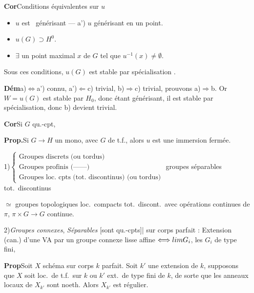 \documentclass[11pt,a4paper]{article}
\begin{document}
\textbf{Cor}\quad Conditions équivalentes sur $u$
\begin{itemize}
  \item[a)] $u$ est \ générisant \quad --- \quad a') $u$ générisant en un point.
  \item[b)] $u(G) \supset H^0$.
  \item[c)] $\exists$ un point maximal $x$ de $G$ tel que $u^{-1}(x) \neq \emptyset$. \struck{\ill{}}
\end{itemize}
Sous ces conditions, $u(G)$ est stable par spécialisation \struck{(\ill{})}.

\textbf{Dém}\quad a)$\Leftrightarrow$a') connu, a')$\Leftarrow$c) \struck{\ill{}}
trivial, b)$\Rightarrow$c) trivial, prouvons a)$\Rightarrow$b. Or
$W = u(G)$ est stable par $H_0$, donc  \ill{} étant générisant, il
est stable par spécialisation, \struck{\ill{}} donc b) devient trivial.

\textbf{Cor}\quad Si $G$ qu.-cpt, 
 \quad {}

\textbf{Prop.}\quad Si $G \to H$ un mono, avec $G$ \struck{\ill{}} de t.f.,
alors $u$ est une immersion fermée.

1)\quad $\left\lbrace\begin{array}{l}
  \text{Groupes discrets (ou tordus)} \\
  \text{Groupes profinis (------)} \\
  \text{Groupes loc.\ cpts (tot.\ discontinus) (ou tordus)}
\end{array}\right.$ \quad groupes séparables tot.\ discontinus

$\simeq$ groupes topologiques loc.\ compacts tot.\ discont.\ avec opérations
continues de $\pi$, $\pi \times G \to G$ continue.

2)\quad \emph{Groupes connexes}, \emph{Séparables}
[sont qu.-cpts]\quad | \quad sur corps parfait : Extension (can.) d'une VA
par un groupe connexe lisse affine $\Longleftrightarrow \varprojlim G_i$,
les $G_i$ de type fini, \ill{}

\struck{\ill{}} \textbf{Prop}\quad Soit $X$ schéma \struck{\ill{}} sur
corps $k$ \struck{\ill{}} parfait. Soit $k'$ une extension de $k$, supposons
que \struck{\ill{}} $X$ soit loc.\ de t.f.\ sur $k$ ou $k'$ ext.\ de type fini
de $k$, de sorte que les anneaux locaux de $X_{k'}$ sont noeth. Alors
$X_{k'}$ est régulier.
\end{document}
